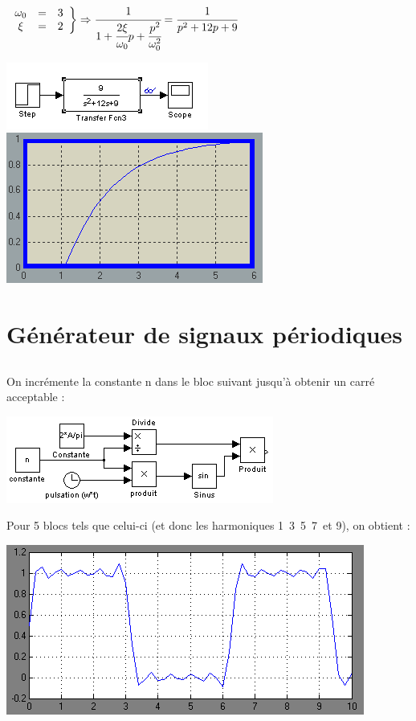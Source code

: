 \documentclass[10pt]{article}
\begin{document}
   $
    \left. \begin{array}{c c c}
     \omega_0 &=& 3 \\
     \xi &=& 2
    \end{array} 
    \right\} 
    \Rightarrow
    \cfrac{1}{1+\cfrac{2\xi}{\omega_0} p+\cfrac{p^2}{\omega_0^2}} = \cfrac{1}{p^2+12p+9}
   $
   \begin{center}
    \includegraphics{3a_3}
    \includegraphics{3a_3-s}
   \end{center}

 \section{Générateur de signaux périodiques}
  \subsection{}
   On incrémente la constante n dans le bloc suivant jusqu’à obtenir un carré acceptable :
   \begin{center}
    \includegraphics{4a}
   \end{center}
   Pour 5 blocs tels que celui-ci (et donc les harmoniques 1 3 5 7 et 9), on obtient :
   \begin{center}
    \includegraphics{4a-s}
   \end{center}
\end{document}
